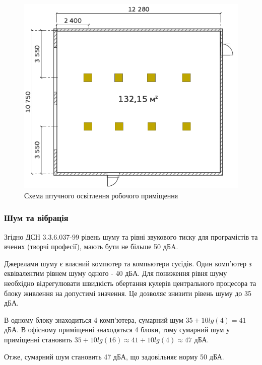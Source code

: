     \begin{figure}[h!]
            \begin{center}
                \includegraphics[scale=0.8]{labour/lab-plan-light.png}
            \end{center}
            \caption{Схема штучного освітлення робочого приміщення}
            \label{fig:lab-plan-light}
    \end{figure}

    \subsubsection{Шум та вібрація}
    
        Згідно ДСН 3.3.6.037-99\cite{lab-dsn37} рівень шуму та рівні звукового тиску для програмістів та вчених (творчі професії), мають бути не більше 50 дБA. 

        Джерелами шуму є власний компютер та компьютери сусідів. Один комп'ютер з еквівалентим рівнем шуму одного - 40 дБА. Для пониження рівня шуму необхідно відрегулювати швидкість обертання кулерів центрального процесора та блоку живлення на допустимі значення. Це дозволяє знизити рівень шуму до 35 дБА.

        В одному блоку знаходиться 4 комп'ютера, сумарний шум $35 + 10lg(4) = 41$ дБА.
        В офісному приміщенні знаходяться 4 блоки, тому сумарний шум у приміщенні становить $35 + 10lg(16) \approx 41 + 10lg(4) \approx 47$ дБА.

        Отже, сумарний шум становить 47 дБА, що задовільняє норму 50 дБА.

